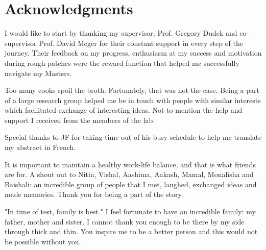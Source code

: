 \chapter*{\rm\bfseries Acknowledgments}

I would like to start by thanking my supervisor, Prof. Gregory Dudek and co-supervisor Prof. David Meger for their constant support in every step of the journey. Their feedback on my progress, enthusiasm at my success and motivation during rough patches were the reward function that helped me successfully navigate my Masters. %

Too many cooks spoil the broth. Fortunately, that was not the case. Being a part of a large research group helped me be in touch with people with similar interests which facilitated exchange of interesting ideas. Not to mention the help and support I received from the members of the lab. %

Special thanks to JF for taking time out of his busy schedule to help me translate my abstract in French.

It is important to maintain a healthy work-life balance, and that is what friends are for. A shout out to Nitin, Vishal, Aashima, Aakash, Mamal, Monalisha and Baishali: an incredible group of people that I met, laughed, exchanged ideas and made memories. Thank you for being a part of the story.

"In time of test, family is best." I feel fortunate to have an incredible family: my father, mother and sister. I cannot thank you enough to be there by my side through thick and thin. You inspire me to be a better person and this would not be possible without you.


